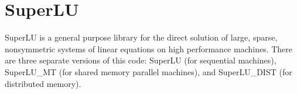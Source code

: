 \section{SuperLU}
SuperLU is a general purpose library for the direct solution of large, sparse,
nonsymmetric systems of linear equations on high performance machines. There are
three separate versions of this code: SuperLU (for sequential machines),
SuperLU\_MT (for shared memory parallel machines), and SuperLU\_DIST (for
distributed memory).